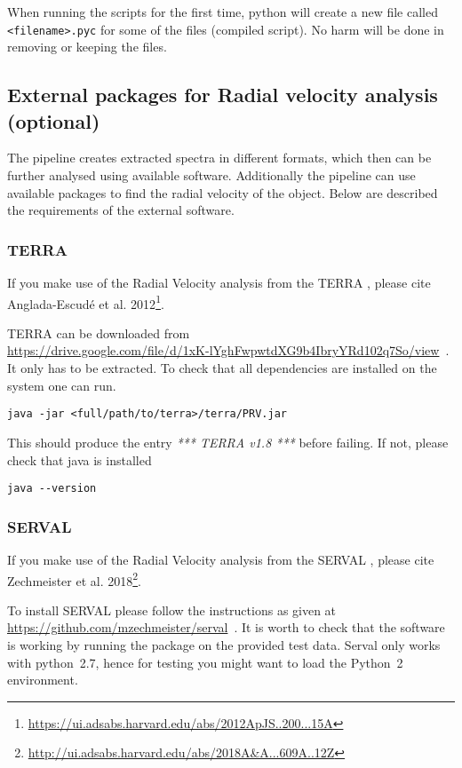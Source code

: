\documentclass[10pt,a4paper]{article}
\begin{document}
When running the scripts for the first time, python will create a new file called \verb|<filename>.pyc| for some of the files (compiled script). No harm will be done in removing or keeping the files.

\subsection{External packages for Radial velocity analysis (optional)}
\label{Sec:RV_packages}
The pipeline creates extracted spectra in different formats, which then can be further analysed using available software. Additionally the pipeline can use available packages to find the radial velocity of the object. Below are described the requirements of the external software.

\subsubsection{TERRA}
If you make use of the Radial Velocity analysis from the TERRA , please cite Anglada-Escud{\'e} et al. 2012\footnote{\url{https://ui.adsabs.harvard.edu/abs/2012ApJS..200...15A}}.

TERRA can be downloaded from\\ \url{https://drive.google.com/file/d/1xK-lYghFwpwtdXG9b4IbryYRd102q7So/view}~. It only has to be extracted. To check that all dependencies are installed on the system one can run.
\begin{lstlisting}[style=base]
java -jar <full/path/to/terra>/terra/PRV.jar
\end{lstlisting}
This should produce the entry \textit{*** TERRA v1.8 ***} before failing. If not, please check that java is installed
\begin{lstlisting}[style=base]
java --version
\end{lstlisting}

\subsubsection{SERVAL}
\label{Section:serval_package}
If you make use of the Radial Velocity analysis from the SERVAL , please cite Zechmeister et al. 2018\footnote{\url{http://ui.adsabs.harvard.edu/abs/2018A&A...609A..12Z}}.

To install SERVAL please follow the instructions as given at\\ \url{https://github.com/mzechmeister/serval}~. It is worth to check that the software is working by running the package on the provided test data. Serval only works with python~2.7, hence for testing you might want to load the Python~2 environment.
\end{document}

